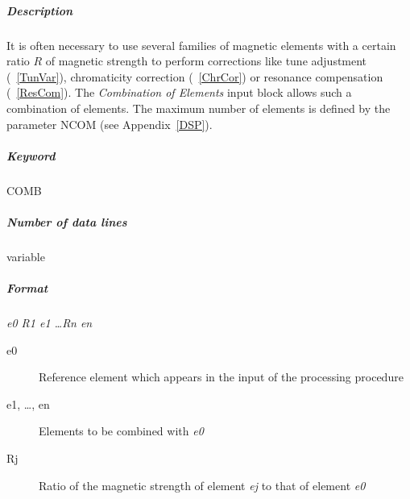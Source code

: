 \subparagraph{Description} It is often necessary to use several
families of magnetic elements with a certain ratio $ R $ of magnetic
strength to perform corrections like tune adjustment (~\ref{TunVar}),
chromaticity correction (~\ref{ChrCor}) or resonance compensation
(~\ref{ResCom}).  The {\em Combination of Elements} \/input block
allows such a combination of elements.  The maximum number of elements
is defined by the parameter NCOM (see Appendix~\ref{DSP}).

\subparagraph{Keyword} COMB \subparagraph{Number of data lines}
variable

\subparagraph{Format} {\em e0 R1 e1 \dots Rn en}

\begin{description}
\item [e0] Reference element which appears in the input of the
  processing procedure
\item [e1, \dots, en] Elements to be combined with {\em e0}
\item [Rj] Ratio of the magnetic strength of element {\em ej} \/to
  that of element {\em e0}
\end{description}

